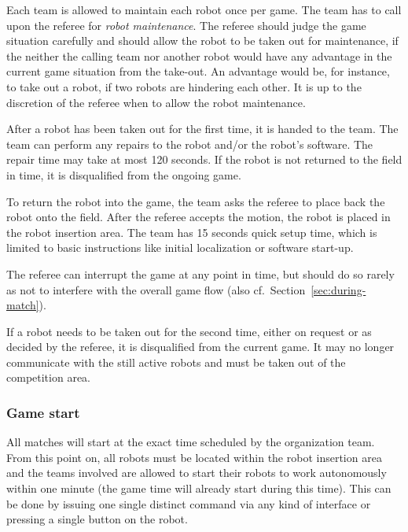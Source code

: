 \documentclass[12pt,twoside]{article}
\newcommand{\refsec}[1]{Section~\ref{#1}}
\begin{document}
Each team is allowed to maintain each robot once per game. The team
has to call upon the referee for \textit{robot maintenance}. The
referee should judge the game situation carefully and should allow the
robot to be taken out for maintenance, if the neither the calling team
nor another robot would have any advantage in the current game
situation from the take-out. An advantage would be, for instance, to
take out a robot, if two robots are hindering each other. It is up to
the discretion of the referee when to allow the robot maintenance.


After a robot has been taken out for the first time, it is handed to
the team. The team can perform any repairs to the robot and/or the
robot's software. %
The repair time may take at most 120 seconds. If the robot is not
returned to the field in time, it is disqualified from the ongoing
game.

To return the robot into the game, the team asks the referee to place
back the robot onto the field. After the referee accepts the motion,
the robot is placed in the robot insertion area. The team has 15
seconds quick setup time, which is limited to basic instructions like
initial localization or software start-up.

The referee can interrupt the game at any point in time, but should do
so rarely as not to interfere with the overall game flow (also
cf.~\refsec{sec:during-match}).

If a robot needs to be taken out for the second time, either on
request or as decided by the referee, it is disqualified from the
current game. It may no longer communicate with the still active
robots and must be taken out of the competition area.

\subsubsection{Game start}
\label{sec:game-start}
%
All matches will start at the exact time scheduled by the organization
team. From this point on, all robots must be located within the robot
insertion area and the teams involved are allowed to start their
robots to work autonomously within one minute (the game time will
already start during this time). This can be done by issuing one
single distinct command via any kind of interface or pressing a single
button on the robot.
\end{document}

